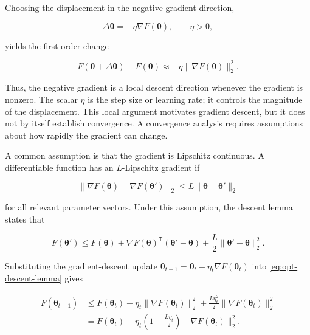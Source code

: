 Choosing the displacement in the negative-gradient direction,

\begin{equation}
    \Delta\boldsymbol{\theta}
    =
    -\eta\nabla F(\boldsymbol{\theta}),
    \qquad \eta>0,
    \label{eq:opt-gradient-displacement}
\end{equation}

yields the first-order change

\begin{equation}
    F(\boldsymbol{\theta}+\Delta\boldsymbol{\theta})
    -
    F(\boldsymbol{\theta})
    \approx
    -\eta\|\nabla F(\boldsymbol{\theta})\|_2^2.
    \label{eq:opt-first-order-decrease}
\end{equation}

Thus, the negative gradient is a local descent direction whenever the
gradient is nonzero. The scalar $\eta$ is the step size or learning rate;
it controls the magnitude of the displacement. This local argument
motivates gradient descent, but it does not by itself establish convergence.
A convergence analysis requires assumptions about how rapidly the gradient
can change.

A common assumption is that the gradient is Lipschitz continuous. A
differentiable function has an $L$-Lipschitz gradient if

\begin{equation}
    \|\nabla F(\boldsymbol{\theta})
      -\nabla F(\boldsymbol{\theta}')\|_2
    \leq
    L\|\boldsymbol{\theta}-\boldsymbol{\theta}'\|_2
    \label{eq:opt-lipschitz-gradient}
\end{equation}

for all relevant parameter vectors. Under this assumption, the descent
lemma states that

\begin{equation}
    F(\boldsymbol{\theta}')
    \leq
    F(\boldsymbol{\theta})
    +
    \nabla F(\boldsymbol{\theta})^{\mathsf{T}}
    (\boldsymbol{\theta}'-\boldsymbol{\theta})
    +
    \frac{L}{2}
    \|\boldsymbol{\theta}'-\boldsymbol{\theta}\|_2^2.
    \label{eq:opt-descent-lemma}
\end{equation}

Substituting the gradient-descent update
$\boldsymbol{\theta}_{t+1}
=\boldsymbol{\theta}_t-\eta_t\nabla F(\boldsymbol{\theta}_t)$
into \cref{eq:opt-descent-lemma} gives

\begin{align}
    F(\boldsymbol{\theta}_{t+1})
    &\leq
    F(\boldsymbol{\theta}_t)
    -
    \eta_t\|\nabla F(\boldsymbol{\theta}_t)\|_2^2
    +
    \frac{L\eta_t^2}{2}
    \|\nabla F(\boldsymbol{\theta}_t)\|_2^2
    \nonumber\\
    &=
    F(\boldsymbol{\theta}_t)
    -
    \eta_t\left(1-\frac{L\eta_t}{2}\right)
    \|\nabla F(\boldsymbol{\theta}_t)\|_2^2.
    \label{eq:opt-gradient-descent-bound}
\end{align}

